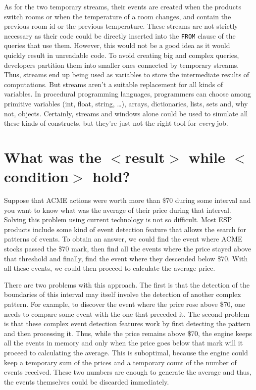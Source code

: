 \documentclass{report}
\begin{document}
As for the two temporary streams, their events are created when the
products switch rooms or when the temperature of a room changes, and
contain the previous room id or the previous temperature. These
streams are not strictly necessary as their code could be directly
inserted into the \verb=FROM= clause of the queries that use
them. However, this would not be a good idea as it would quickly
result in unreadable code. To avoid creating big and complex queries,
developers partition them into smaller ones connected by temporary
streams. Thus, streams end up being used as variables to store the
intermediate results of computations. But streams aren't a suitable
replacement for all kinds of variables. In procedural programming
languages, programmers can choose among primitive variables (int,
float, string, \dots), arrays, dictionaries, lists, sets and, why not,
objects. Certainly, streams and windows alone could be used to
simulate all these kinds of constructs, but they're just not the right
tool for \emph{every} job.


\section{What was the $<$result$>$ while $<$condition$>$ hold?}
\label{sec:result-while}

Suppose that ACME actions were worth more than \$70 during some
interval and you want to know what was the average of their price
during that interval. Solving this problem using current technology is
not so difficult. Most ESP products include some kind of event
detection feature that allows the search for patterns of events. To
obtain an answer, we could find the event where ACME stocks passed the
\$70 mark, then find all the events where the price stayed above that
threshold and finally, find the event where they descended below
\$70. With all these events, we could then proceed to calculate the
average price.

There are two problems with this approach. The first is that the
detection of the boundaries of this interval may itself involve the
detection of another complex pattern. For example, to discover the
event where the price rose above \$70, one needs to compare some event
with the one that preceded it. The second problem is that these
complex event detection features work by first detecting the pattern
and then processing it. Thus, while the price remains above \$70, the
engine keeps all the events in memory and only when the price goes
below that mark will it proceed to calculating the average. This is
suboptimal, because the engine could keep a temporary sum of the
prices and a temporary count of the number of events received. These
two numbers are enough to generate the average and thus, the events
themselves could be discarded immediately.
\end{document}
